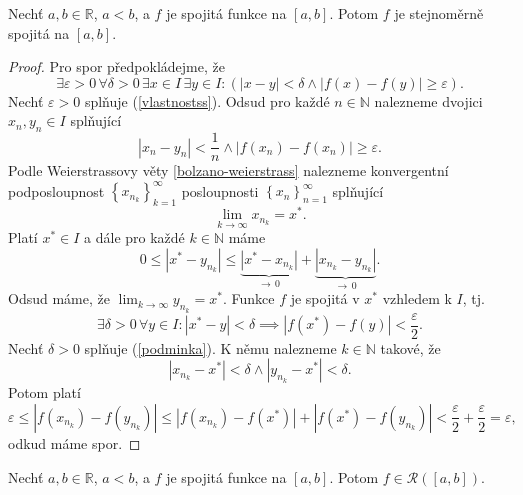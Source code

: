\begin{veta}\label{veta8.15}
Nechť $a,b \in \mathbb{R}$, $a<b$, a $f$ je spojitá funkce na $[a,b]$. Potom $f$ je stejnoměrně spojitá na $[a,b]$.
\end{veta}

\begin{proof}
	Pro spor předpokládejme, že
	\begin{equation}\label{vlastnostss}
	\exists \varepsilon > 0 \, \forall \delta > 0 \, \exists x \in I \, \exists y \in I : \left( |x-y| < \delta\land |f(x)-f(y)|\geq\varepsilon \right ).
	\end{equation}
	Nechť $\varepsilon>0$ splňuje (\ref{vlastnostss}). Odsud pro každé $n \in \mathbb N $ nalezneme
	dvojici $x_n, y_n \in I$ splňující
	$$
	    |x_n - y_n| < \frac{1}{n} \land |f(x_n)-f(x_n)|\geq \varepsilon.
	$$
	Podle Weierstrassovy věty \ref{bolzano-weierstrass} nalezneme konvergentní podposloupnost
	$\left \{ x_{n_k} \right \}_{k=1}^\infty $ posloupnosti $\left \{ x_n \right \}_{n=1}^\infty $
	splňující
	$$
 \lim_{k \to \infty} x_{n_k} = x^*.
	$$
	Platí $x^* \in I$ a dále pro každé $k \in \mathbb N $ máme
	$$
	    0\leq|x^* - y_{n_k}| \leq \underbrace{|x^*-x_{n_k}|}_{\to \, 0}+\underbrace{|x_{n_k}-y_{n_k}|}_{\to\, 0}.
	$$
	Odsud máme, že $\lim_{k \to \infty} y_{n_k}=x^*$.
	Funkce $f$ je spojitá v $x^*$ vzhledem k $I$, tj.
	\begin{equation}\label{podminka}
	\exists \delta > 0 \, \forall y \in I: |x^* - y|<\delta \implies |f(x^*)-f(y)|<\frac{\varepsilon}{2}.
\end{equation}
	Nechť $\delta >0$ splňuje (\ref{podminka}). K němu nalezneme $k \in \mathbb N $ takové, že
	$$
	    |x_{n_k}-x^*|< \delta \land |y_{n_k} - x^*| <\delta.
	$$
	Potom platí
	$$
	    \varepsilon \leq|f(x_{n_k}) - f(y_{n_k})|\leq |f(x_{n_k})-f(x^*)| + |f(x^*)-f(y_{n_k})| < \frac{\varepsilon }{2}+\frac{\varepsilon}{2}= \varepsilon,
	$$
	odkud máme spor.
\end{proof}

\begin{veta}\label{veta8.16}
Nechť $a,b \in \mathbb{R}$, $a<b$, a $f$ je spojitá funkce na $[a,b]$. Potom $f \in \mathcal R([a,b])$.
\end{veta}

